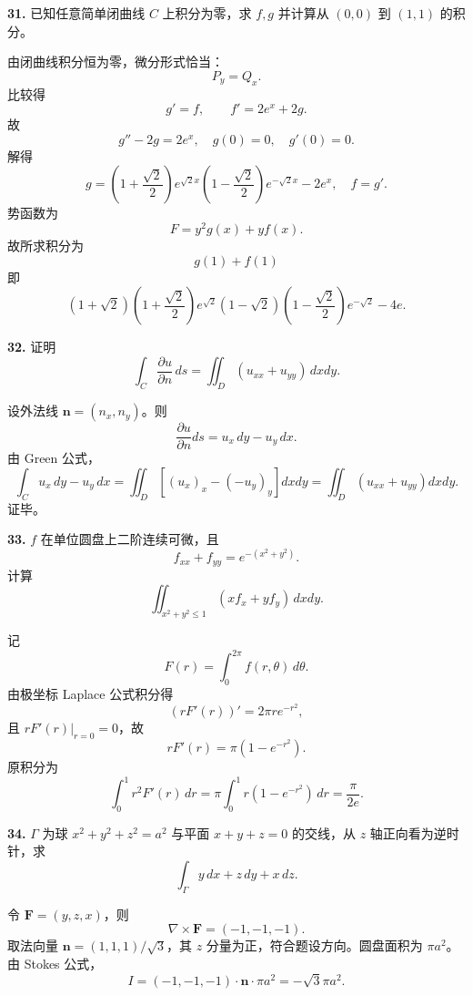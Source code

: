 \begin{problemblock}
\textbf{31.} 已知任意简单闭曲线 \(C\) 上积分为零，求 \(f,g\) 并计算从 \((0,0)\) 到 \((1,1)\) 的积分。
\end{problemblock}
\begin{solutionblock}
由闭曲线积分恒为零，微分形式恰当：
\[
P_y=Q_x.
\]
比较得
\[
g'=f,\qquad f'=2e^x+2g.
\]
故
\[
g''-2g=2e^x,\quad g(0)=0,\quad g'(0)=0.
\]
解得
\[
g=\left(1+\frac{\sqrt2}{2}\right)e^{\sqrt2x}
\left(1-\frac{\sqrt2}{2}\right)e^{-\sqrt2x}-2e^x,
\quad f=g'.
\]
势函数为
\[
F=y^2g(x)+yf(x).
\]
故所求积分为
\[
\boxed{g(1)+f(1)}
\]
即
\[
\boxed{(1+\sqrt2)\left(1+\frac{\sqrt2}{2}\right)e^{\sqrt2}
(1-\sqrt2)\left(1-\frac{\sqrt2}{2}\right)e^{-\sqrt2}-4e }.
\]
\end{solutionblock}

\begin{problemblock}
\textbf{32.} 证明
\[
\int_C\frac{\partial u}{\partial n}\,ds
=\iint_D(u_{xx}+u_{yy})\,dxdy.
\]
\end{problemblock}
\begin{solutionblock}
设外法线 \(\boldsymbol n=(n_x,n_y)\)。则
\[
\frac{\partial u}{\partial n}ds=u_x\,dy-u_y\,dx.
\]
由 Green 公式，
\[
\int_Cu_x\,dy-u_y\,dx
=\iint_D\left[(u_x)_x-(-u_y)_y\right]dxdy
=\iint_D(u_{xx}+u_{yy})dxdy.
\]
证毕。
\end{solutionblock}

\begin{problemblock}
\textbf{33.} \(f\) 在单位圆盘上二阶连续可微，且
\[
f_{xx}+f_{yy}=e^{-(x^2+y^2)}.
\]
计算
\[
\iint_{x^2+y^2\le1}(xf_x+yf_y)\,dxdy.
\]
\end{problemblock}
\begin{solutionblock}
记
\[
F(r)=\int_0^{2\pi}f(r,\theta)\,d\theta.
\]
由极坐标 Laplace 公式积分得
\[
(rF'(r))'=2\pi r e^{-r^2},
\]
且 \(rF'(r)|_{r=0}=0\)，故
\[
rF'(r)=\pi(1-e^{-r^2}).
\]
原积分为
\[
\int_0^1r^2F'(r)\,dr
=\pi\int_0^1r(1-e^{-r^2})\,dr
=\boxed{\frac{\pi}{2e}}.
\]
\end{solutionblock}

\begin{problemblock}
\textbf{34.} \(\Gamma\) 为球 \(x^2+y^2+z^2=a^2\) 与平面 \(x+y+z=0\) 的交线，从 \(z\) 轴正向看为逆时针，求
\[
\int_\Gamma y\,dx+z\,dy+x\,dz.
\]
\end{problemblock}
\begin{solutionblock}
令 \(\boldsymbol F=(y,z,x)\)，则
\[
\nabla\times\boldsymbol F=(-1,-1,-1).
\]
取法向量 \(\boldsymbol n=(1,1,1)/\sqrt3\)，其 \(z\) 分量为正，符合题设方向。圆盘面积为 \(\pi a^2\)。由 Stokes 公式，
\[
I=(-1,-1,-1)\cdot\boldsymbol n\cdot\pi a^2
=\boxed{-\sqrt3\pi a^2}.
\]
\end{solutionblock}

